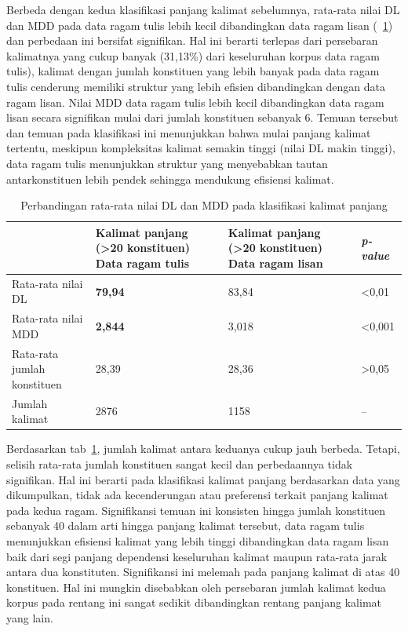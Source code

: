 Berbeda dengan kedua klasifikasi panjang kalimat sebelumnya, rata-rata nilai DL dan MDD pada data ragam tulis lebih kecil dibandingkan data ragam lisan (\tab~\ref{tab:DL_MDD_panjang}) dan perbedaan ini bersifat signifikan. Hal ini berarti terlepas dari persebaran kalimatnya yang cukup banyak (31,13\%) dari keseluruhan korpus data ragam tulis), kalimat dengan jumlah konstituen yang lebih banyak pada data ragam tulis cenderung memiliki struktur yang lebih efisien dibandingkan dengan data ragam lisan. Nilai MDD data ragam tulis lebih kecil dibandingkan data ragam lisan secara signifikan mulai dari jumlah konstituen sebanyak 6. Temuan tersebut dan temuan pada klasifikasi ini menunjukkan bahwa mulai panjang kalimat tertentu, meskipun kompleksitas kalimat semakin tinggi (nilai DL makin tinggi), data ragam tulis menunjukkan struktur yang menyebabkan tautan antarkonstituen lebih pendek sehingga mendukung efisiensi kalimat. 

\begin{table}
\begin{center}
\begin{small}
\caption{Perbandingan rata-rata nilai DL dan MDD pada klasifikasi kalimat panjang}  \label{tab:DL_MDD_panjang}
\begin{tabular}{ | p{3.2cm} | p{3.2cm} | p{3.2cm} | p{2cm} |}
    \hline
 & Kalimat panjang \newline (\textgreater20 konstituen) \newline Data ragam tulis & Kalimat panjang \newline (\textgreater20 konstituen) \newline Data ragam lisan & \textit{p-value} \\ \hline
 Rata-rata nilai DL & \textbf{79,94} & 83,84 & \textless 0,01 \\ \hline
 Rata-rata nilai MDD & \textbf{2,844} & 3,018 & \textless 0,001 \\ \hline
 Rata-rata jumlah konstituen & 28,39 & 28,36 & \textgreater 0,05 \\ \hline
 Jumlah kalimat & 2876 & 1158 & -- \\ \hline
   \end{tabular}
   \end{small}
\end{center}
\end{table}

Berdasarkan tab~\ref{tab:DL_MDD_panjang}, jumlah kalimat antara keduanya cukup jauh berbeda. Tetapi, selisih rata-rata jumlah konstituen sangat kecil dan perbedaannya tidak signifikan. Hal ini berarti pada klasifikasi kalimat panjang berdasarkan data yang dikumpulkan, tidak ada kecenderungan atau preferensi terkait panjang kalimat pada kedua ragam. Signifikansi temuan ini konsisten hingga jumlah konstituen sebanyak 40 dalam arti hingga panjang kalimat tersebut, data ragam tulis menunjukkan efisiensi kalimat yang lebih tinggi dibandingkan data ragam lisan baik dari segi panjang dependensi keseluruhan kalimat maupun rata-rata jarak antara dua konstituten. Signifikansi ini melemah pada panjang kalimat di atas 40 konstituen. Hal ini mungkin disebabkan oleh persebaran jumlah kalimat kedua korpus pada rentang ini sangat sedikit dibandingkan rentang panjang kalimat yang lain.  

